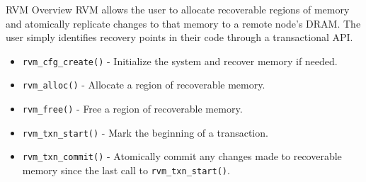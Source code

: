 \begin{block}{RVM Overview}
    RVM allows the user to allocate recoverable regions of memory and
    atomically replicate changes to that memory to a remote node’s DRAM. The
    user simply identifies recovery points in their code through a
    transactional API.

    \begin{itemize}
        \item \verb|rvm_cfg_create()| - Initialize the system and recover
            memory if needed.
        \item \verb|rvm_alloc()| - Allocate a region of recoverable memory.
        \item \verb|rvm_free()| - Free a region of recoverable memory.
        \item \verb|rvm_txn_start()| - Mark the beginning of a transaction.
        \item \verb|rvm_txn_commit()| - Atomically commit any changes made
            to recoverable memory since the last call to \verb|rvm_txn_start()|.
    \end{itemize}
\end{block}
